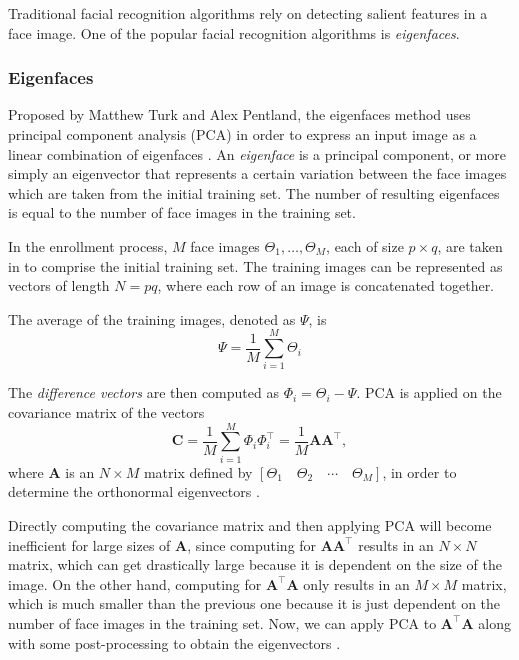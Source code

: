 Traditional facial recognition algorithms rely on detecting salient features in a face image. One of the popular facial recognition algorithms is \textit{eigenfaces}.

\subsubsection{Eigenfaces}
Proposed by Matthew Turk and Alex Pentland, the eigenfaces method uses principal component analysis (PCA) in order to express an input image as a linear combination of eigenfaces \cite{turk_eigenfaces_1991}. An \textit{eigenface} is a principal component, or more simply an eigenvector that represents a certain variation between the face images which are taken from the initial training set. The number of resulting eigenfaces is equal to the number of face images in the training set.

In the enrollment process, $M$ face images $\Theta_1, \ldots, \Theta_M$, each of size $p \times q$, are taken in to comprise the initial training set. The training images can be represented as vectors of length $N = pq$, where each row of an image is concatenated together.

The average of the training images, denoted as $\Psi$, is 
\begin{equation}
	\Psi = \frac{1}{M} \sum_{i=1}^{M} \Theta_i
\end{equation}

The \textit{difference vectors} are then computed as $\Phi_i = \Theta_i - \Psi$. PCA is applied on the covariance matrix of the vectors
\begin{equation}
	\mathbf{C} = \frac{1}{M} \sum_{i=1}^M \Phi_i \Phi_i^\top = \frac{1}{M} \mathbf{A}\mathbf{A}^\top,
\end{equation}
where $\mathbf{A}$ is an $N \times M$ matrix defined by $\left[\Theta_1 \quad \Theta_2 \quad \cdots \quad \Theta_M\right]$, in order to determine the orthonormal eigenvectors \cite{hutchison_privacy-preserving_2009}.

Directly computing the covariance matrix and then applying PCA will become inefficient for large sizes of $\mathbf{A}$, since computing for $\mathbf{A}\mathbf{A}^\top$ results in an $N \times N$ matrix, which can get drastically large because it is dependent on the size of the image. On the other hand, computing for $\mathbf{A}^\top\mathbf{A}$ only results in an $M \times M$ matrix, which is much smaller than the previous one because it is just dependent on the number of face images in the training set. Now, we can apply PCA to $\mathbf{A}^\top\mathbf{A}$ along with some post-processing to obtain the eigenvectors \cite{hutchison_privacy-preserving_2009}. 

